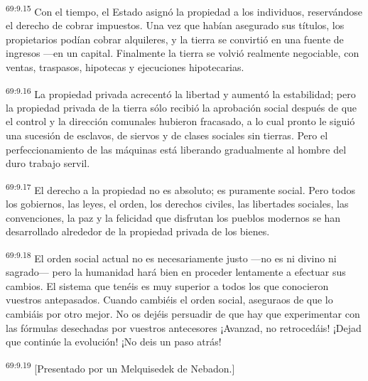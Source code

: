 \par
\textsuperscript{69:9.15} Con el tiempo, el Estado asignó la propiedad a los individuos, reservándose el derecho de cobrar impuestos. Una vez que habían asegurado sus títulos, los propietarios podían cobrar alquileres, y la tierra se convirtió en una fuente de ingresos ---en un capital. Finalmente la tierra se volvió realmente negociable, con ventas, traspasos, hipotecas y ejecuciones hipotecarias.

\par
\textsuperscript{69:9.16} La propiedad privada acrecentó la libertad y aumentó la estabilidad; pero la propiedad privada de la tierra sólo recibió la aprobación social después de que el control y la dirección comunales hubieron fracasado, a lo cual pronto le siguió una sucesión de esclavos, de siervos y de clases sociales sin tierras. Pero el perfeccionamiento de las máquinas está liberando gradualmente al hombre del duro trabajo servil.

\par
\textsuperscript{69:9.17} El derecho a la propiedad no es absoluto; es puramente social. Pero todos los gobiernos, las leyes, el orden, los derechos civiles, las libertades sociales, las convenciones, la paz y la felicidad que disfrutan los pueblos modernos se han desarrollado alrededor de la propiedad privada de los bienes.

\par
\textsuperscript{69:9.18} El orden social actual no es necesariamente justo ---no es ni divino ni sagrado--- pero la humanidad hará bien en proceder lentamente a efectuar sus cambios. El sistema que tenéis es muy superior a todos los que conocieron vuestros antepasados. Cuando cambiéis el orden social, aseguraos de que lo cambiáis por otro mejor. No os dejéis persuadir de que hay que experimentar con las fórmulas desechadas por vuestros antecesores ¡Avanzad, no retrocedáis! ¡Dejad que continúe la evolución! ¡No deis un paso atrás!

\par
\textsuperscript{69:9.19} [Presentado por un Melquisedek de Nebadon.]